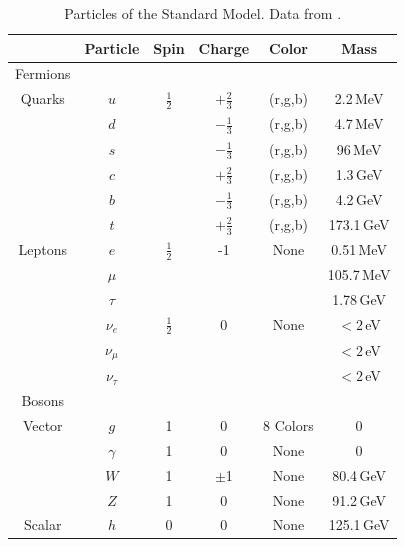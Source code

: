                                                                                                                                                                                                                                                                                                                                                                                                                                                                                                                                                                                                                                                                                                                                                                  

\begin{table}[]
	\centering
	\begin{tabular}{c||c|c|c|c|c|}
		\hline 
		& Particle & Spin  & Charge & Color & Mass \\
		\hline \hline
		Fermions & & & & & \\
		\hline
		\rule{0pt}{2.6ex}
		Quarks & $u$ & $\frac{1}{2}$ & $+\frac{2}{3}$ & (r,g,b) & 2.2\,MeV \\
		\rule{0pt}{2.6ex}
		& $d$ & & $-\frac{1}{3}$ & (r,g,b) & 4.7\,MeV \\
		\rule{0pt}{2.6ex}
		& $s$ &  & $-\frac{1}{3}$ & (r,g,b) & 96\,MeV \\
		\rule{0pt}{2.6ex}
		& $c$ &  & $+\frac{2}{3}$ & (r,g,b) & 1.3\,GeV \\
		\rule{0pt}{2.6ex}
		& $b$ &  & $-\frac{1}{3}$ & (r,g,b) & 4.2\,GeV \\
		\rule{0pt}{2.6ex}
		& $t$ &  & $+\frac{2}{3}$ & (r,g,b) & 173.1\,GeV \rule[-1.2ex]{0pt}{0pt}\\
		\hline
		Leptons & $e$ & $\frac{1}{2}$ & -1 & None & 0.51\,MeV \\
		& $\mu$ & & & & 105.7\,MeV \\
		& $\tau$ & & & & 1.78\,GeV \\
		& $\nu_{e}$ & $\frac{1}{2}$ & 0 & None & $<2$\,eV \\
		& $\nu_{\mu}$ & & & & $<2$\,eV  \\ 
		& $\nu_{\tau}$ & & & & $<2$\,eV  \\ 
		\hline
		Bosons  & & & & & \\
		\hline
		Vector  & $g$   & 1 & 0 & 8 Colors & 0 \\
		& $\gamma$ & 1 & 0 & None & 0 \\
		& $W$  & 1 & $\pm$1 & None & 80.4\,GeV \\
		& $Z$  & 1 & 0  & None & 91.2\,GeV \\
		Scalar & $h$ & 0 & 0  & None & 125.1\,GeV \\
		\hline \hline   
	\end{tabular}
	\caption{Particles of the Standard Model.  Data from \cite{PDG}.}
	\label{tab:StandardModel}
\end{table}  

